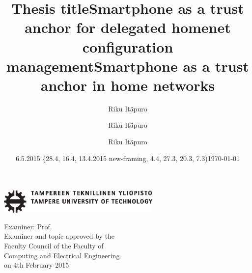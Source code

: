 \documentclass[12pt,a4paper,english]{tutthesis}
\author{Riku Itäpuro}
\title{Thesis title}      %
\author{Riku Itäpuro}
\title{Smartphone as a trust anchor for delegated homenet configuration management}
\author{Riku Itäpuro}
\date{6.5.2015 \{28.4, 16.4, 13.4.2015 new-framing, 4.4, 27.3,  20.3, 7.3)}
\title{Smartphone as a trust anchor in home networks}
\begin{document}
\maketitle



\newpage             %

 \pagestyle{headings}
 \thispagestyle{empty}
\date\today
 \vspace*{-.5cm}\noindent
 \includegraphics[width=8cm]{tty_tut_logo}   %

\vspace{6.8cm}
\maketitle
\vspace{6.7cm} %

\begin{flushright}  
  \begin{minipage}[c]{6.8cm}
    \begin{spacing}{1.0}
      \textsf{Examiner: Prof. \@examiner}\\
      \textsf{Examiner and topic approved by the}\\ 
      \textsf{Faculty Council of the Faculty of} \\
      \textsf{Computing and Electrical Engineering} \\
      \textsf{on 4th February 2015}\\
    \end{spacing}
  \end{minipage}
\end{flushright}
\end{document}
